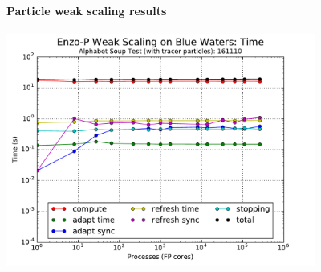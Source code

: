 \begin{frame}[fragile] 
  \secframetitle{\ssRecentParticles}
  \framesubtitle{Particle weak scaling results}
\begin{center}
  \vspace{-0.1in}
  \begin{minipage}{4.50in}
    \begin{center}
      \begin{minipage}{4in}
    \includegraphics[width=4.0in]{scaling-time-161110.pdf}
    \end{minipage} \\
    \end{center}
  \end{minipage} \\
\end{center}
  
\end{frame}


